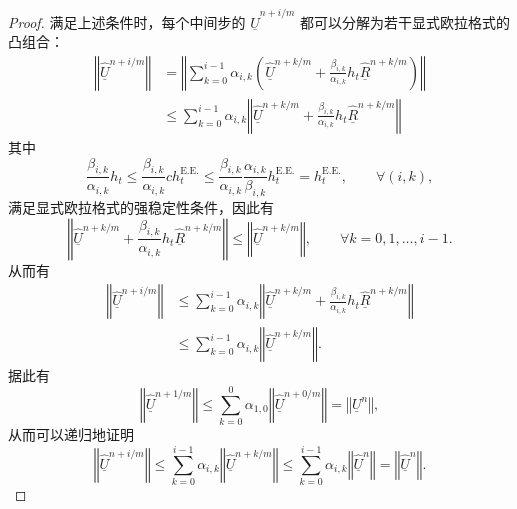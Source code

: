 \begin{proof}
满足上述条件时，每个中间步的 $\underline{\hat{U}}^{n+i/m}$ 都可以分解为若干显式欧拉格式的凸组合：
\begin{equation}
\begin{aligned}\left\Vert \underline{\hat{U}}^{n+i/m}\right\Vert  & =\left\Vert \sum_{k=0}^{i-1}\alpha_{i,k}\left(\underline{\hat{U}}^{n+k/m}+\frac{\beta_{i,k}}{\alpha_{i,k}}h_{t}\underline{\hat{R}}^{n+k/m}\right)\right\Vert \\
 & \le\sum_{k=0}^{i-1}\alpha_{i,k}\left\Vert \underline{\hat{U}}^{n+k/m}+\frac{\beta_{i,k}}{\alpha_{i,k}}h_{t}\underline{\hat{R}}^{n+k/m}\right\Vert 
\end{aligned}
\end{equation}
其中
\begin{equation}
\frac{\beta_{i,k}}{\alpha_{i,k}}h_{t}\le\frac{\beta_{i,k}}{\alpha_{i,k}}ch_{t}^{\mathrm{E.E.}}\le\frac{\beta_{i,k}}{\alpha_{i,k}}\frac{\alpha_{i,k}}{\beta_{i,k}}h_{t}^{\mathrm{E.E.}}=h_{t}^{\mathrm{E.E.}},\qquad\forall(i,k),
\end{equation}
满足显式欧拉格式的强稳定性条件，因此有
\begin{equation}
\left\Vert \underline{\hat{U}}^{n+k/m}+\frac{\beta_{i,k}}{\alpha_{i,k}}h_{t}\underline{\hat{R}}^{n+k/m}\right\Vert \le\left\Vert \underline{\hat{U}}^{n+k/m}\right\Vert ,\qquad\forall k=0,1,\dots,i-1.
\end{equation}
从而有
\begin{equation}
\begin{aligned}\left\Vert \underline{\hat{U}}^{n+i/m}\right\Vert  & \le\sum_{k=0}^{i-1}\alpha_{i,k}\left\Vert \underline{\hat{U}}^{n+k/m}+\frac{\beta_{i,k}}{\alpha_{i,k}}h_{t}\underline{\hat{R}}^{n+k/m}\right\Vert \\
 & \le\sum_{k=0}^{i-1}\alpha_{i,k}\left\Vert \underline{\hat{U}}^{n+k/m}\right\Vert .
\end{aligned}
\end{equation}
据此有
\begin{equation}
\left\Vert \underline{\hat{U}}^{n+1/m}\right\Vert \le\sum_{k=0}^{0}\alpha_{1,0}\left\Vert \underline{\hat{U}}^{n+0/m}\right\Vert =\left\Vert \underline{U}^{n}\right\Vert ,
\end{equation}
从而可以递归地证明
\begin{equation}
\left\Vert \underline{\hat{U}}^{n+i/m}\right\Vert \le\sum_{k=0}^{i-1}\alpha_{i,k}\left\Vert \underline{\hat{U}}^{n+k/m}\right\Vert \le\sum_{k=0}^{i-1}\alpha_{i,k}\left\Vert \underline{\hat{U}}^{n}\right\Vert =\left\Vert \underline{\hat{U}}^{n}\right\Vert .
\end{equation}
\end{proof}

